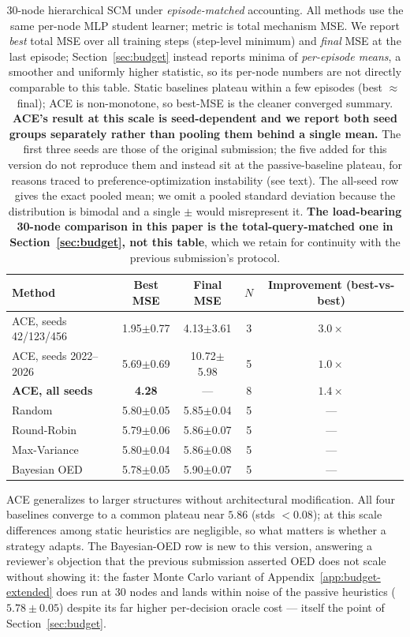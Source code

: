 \documentclass[twoside]{article}
\theoremstyle{plain}
\theoremstyle{definition}
\theoremstyle{remark}
\begin{document}
\begin{table}[t]
\centering
\caption{30-node hierarchical SCM under \emph{episode-matched} accounting. All methods use the same per-node MLP student learner; metric is total mechanism MSE. We report \emph{best} total MSE over all training steps (step-level minimum) and \emph{final} MSE at the last episode; Section~\ref{sec:budget} instead reports minima of \emph{per-episode means}, a smoother and uniformly higher statistic, so its per-node numbers are not directly comparable to this table. Static baselines plateau within a few episodes (best $\approx$ final); ACE is non-monotone, so best-MSE is the cleaner converged summary. \textbf{ACE's result at this scale is seed-dependent and we report both seed groups separately rather than pooling them behind a single mean.} The first three seeds are those of the original submission; the five added for this version do not reproduce them and instead sit at the passive-baseline plateau, for reasons traced to preference-optimization instability (see text). The all-seed row gives the exact pooled mean; we omit a pooled standard deviation because the distribution is bimodal and a single $\pm$ would misrepresent it. \textbf{The load-bearing 30-node comparison in this paper is the total-query-matched one in Section~\ref{sec:budget}, not this table}, which we retain for continuity with the previous submission's protocol.}
\label{tab:large-scale}
\small
\begin{tabular}{@{}lcccc@{}}
\toprule
Method & Best MSE & Final MSE & $N$ & Improvement (best-vs-best) \\
\midrule
ACE, seeds 42/123/456   & 1.95$\pm$0.77 & 4.13$\pm$3.61 & 3 & $3.0\times$ \\
ACE, seeds 2022--2026   & 5.69$\pm$0.69 & 10.72$\pm$5.98 & 5 & $1.0\times$ \\
\textbf{ACE, all seeds} & \textbf{4.28} & --- & 8 & $1.4\times$ \\
\midrule
Random       & 5.80$\pm$0.05 & 5.85$\pm$0.04 & 5 & --- \\
Round-Robin  & 5.79$\pm$0.06 & 5.86$\pm$0.07 & 5 & --- \\
Max-Variance & 5.80$\pm$0.04 & 5.86$\pm$0.08 & 5 & --- \\
Bayesian OED & 5.78$\pm$0.05 & 5.90$\pm$0.07 & 5 & --- \\
\bottomrule
\end{tabular}
\end{table}

ACE generalizes to larger structures without architectural modification. All four baselines converge to a common plateau near $5.86$ (stds $<\!0.08$); at this scale differences among static heuristics are negligible, so what matters is whether a strategy adapts. The Bayesian-OED row is new to this version, answering a reviewer's objection that the previous submission asserted OED does not scale without showing it: the faster Monte Carlo variant of Appendix~\ref{app:budget-extended} does run at 30 nodes and lands within noise of the passive heuristics ($5.78\pm0.05$) despite its far higher per-decision oracle cost --- itself the point of Section~\ref{sec:budget}.
\end{document}
